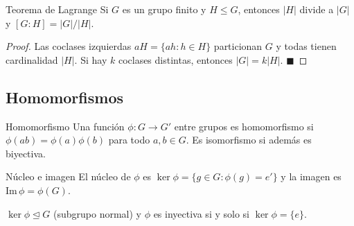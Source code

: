 \documentclass[12pt]{article}
\begin{document}
\begin{teorema}[4.2]{Teorema de Lagrange}
Si $G$ es un grupo finito y $H \leq G$, entonces $|H|$ divide a $|G|$ y $[G:H] = |G|/|H|$.
\end{teorema}
\begin{proof}
Las coclases izquierdas $aH = \{ah : h \in H\}$ particionan $G$ y todas tienen cardinalidad $|H|$. Si hay $k$ coclases distintas, entonces $|G| = k|H|$. $\blacksquare$
\end{proof}

\subsection{Homomorfismos}

\begin{definicion}[4.3]{Homomorfismo}
Una función $\phi : G \to G'$ entre grupos es homomorfismo si $\phi(ab) = \phi(a)\phi(b)$ para todo $a,b \in G$. Es isomorfismo si además es biyectiva.
\end{definicion}

\begin{definicion}[4.4]{Núcleo e imagen}
El núcleo de $\phi$ es $\ker\phi = \{g \in G : \phi(g) = e'\}$ y la imagen es $\mathrm{Im}\,\phi = \phi(G)$.
\end{definicion}

\begin{proposicion}[4.2]{}
$\ker\phi \trianglelefteq G$ (subgrupo normal) y $\phi$ es inyectiva si y solo si $\ker\phi = \{e\}$.
\end{proposicion}
\end{document}
